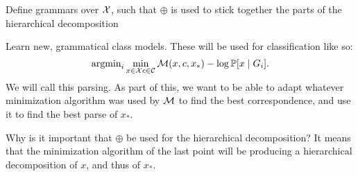 \item Define grammars over ${\mathcal X}$, such that $\oplus$ is used to stick
  together the parts of the hierarchical decomposition

\item Learn new, grammatical class models. These will be used for
  classification like so:
$$\operatorname{argmin}_i \min_{x\in {\mathcal X} c\in {\mathcal C}} {\mathcal M}(x, c, x_*) - \log\mathbb{P}[x
    \mid G_i].$$ We will call this parsing.  As part of this, we want
  to be able to adapt whatever minimization algorithm was used by
  ${\mathcal M}$ to find the best correspondence, and use it to find the best
  parse of $x_*$.  
\eitem

Why is it important that $\oplus$ be used for the hierarchical
decomposition? It means that the minimization algorithm of the last
point will be producing a hierarchical decomposition of $x$, and thus
of $x_*$.


